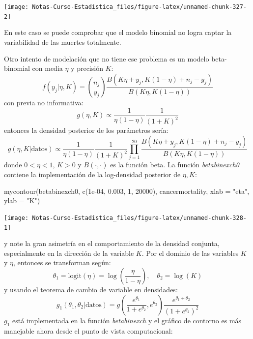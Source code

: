 \documentclass[
  12pt,
]{book}
\newenvironment{Shaded}{\begin{snugshade}}{\end{snugshade}}
\newcommand{\AttributeTok}[1]{\textcolor[rgb]{0.77,0.63,0.00}{#1}}
\newcommand{\DecValTok}[1]{\textcolor[rgb]{0.00,0.00,0.81}{#1}}
\newcommand{\FloatTok}[1]{\textcolor[rgb]{0.00,0.00,0.81}{#1}}
\newcommand{\FunctionTok}[1]{\textcolor[rgb]{0.00,0.00,0.00}{#1}}
\newcommand{\NormalTok}[1]{#1}
\newcommand{\StringTok}[1]{\textcolor[rgb]{0.31,0.60,0.02}{#1}}
\theoremstyle{definition}
\theoremstyle{definition}
\theoremstyle{definition}
\theoremstyle{definition}
\theoremstyle{remark}
\begin{document}
\begin{center}\texttt{[image: Notas-Curso-Estadistica\_files/figure-latex/unnamed-chunk-327-2]} \end{center}

En este caso se puede comprobar que el modelo binomial no logra captar la variabilidad de las muertes totalmente.

Otro intento de modelación que no tiene ese problema es un modelo beta-binomial con media \(\eta\) y precisión \(K\):
\[f(y_j|\eta,K)={n_j \choose y_j}\frac{B(K\eta+y_j,K(1-\eta)+n_j-y_j)}{B(K\eta,K(1-\eta))}\]
con previa no informativa:
\[g(\eta,K)\propto \frac{1}{\eta(1-\eta)}\frac{1}{(1+K)^2}\]
entonces la densidad posterior de los parámetros sería:
\[g(\eta,K|\text{datos})\propto \frac{1}{\eta(1-\eta)}\frac{1}{(1+K)^2} \prod_{j=1}^{20}\frac{B(K\eta+y_j,K(1-\eta)+n_j-y_j)}{B(K\eta,K(1-\eta))}\]
donde \(0<\eta<1\), \(K>0\) y \(B(\cdot,\cdot)\) es la función beta. La función \emph{betabinexch0} contiene la implementación de la log-densidad posterior de \(\eta,K\):

\begin{Shaded}
\begin{Highlighting}[]
\FunctionTok{mycontour}\NormalTok{(betabinexch0, }\FunctionTok{c}\NormalTok{(}\FloatTok{1e{-}04}\NormalTok{, }\FloatTok{0.003}\NormalTok{, }\DecValTok{1}\NormalTok{, }\DecValTok{20000}\NormalTok{),}
\NormalTok{    cancermortality, }\AttributeTok{xlab =} \StringTok{"eta"}\NormalTok{, }\AttributeTok{ylab =} \StringTok{"K"}\NormalTok{)}
\end{Highlighting}
\end{Shaded}

\begin{center}\texttt{[image: Notas-Curso-Estadistica\_files/figure-latex/unnamed-chunk-328-1]} \end{center}

y note la gran asimetría en el comportamiento de la densidad conjunta, especialmente en la dirección de la variable \(K\). Por el dominio de las variables \(K\) y \(\eta\), entonces se transforman según:
\[\theta_1=\text{logit}(\eta)=\log\left(\frac{\eta}{1-\eta}\right),\quad  \theta_2=\log(K)\]
y usando el teorema de cambio de variable en densidades:
\[g_1(\theta_1,\theta_2|\text{datos})=g\left(\frac{e^{\theta_1}}{1+e^{\theta_2}},e^{\theta_2}\right)\frac{e^{\theta_1+\theta_2}}{(1+e^{\theta_2})^2}\]
\(g_1\) está implementada en la función \emph{betabinexch} y el gráfico de contorno es más manejable ahora desde el punto de vista computacional:
\end{document}
